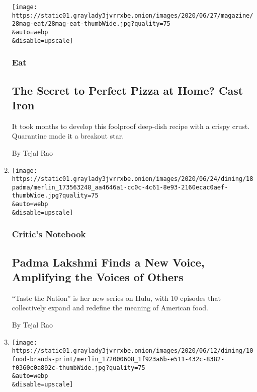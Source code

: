 \begin{enumerate}
  \texttt{[image: https://static01.graylady3jvrrxbe.onion/images/2020/06/27/magazine/28mag-eat/28mag-eat-thumbWide.jpg?quality=75\\\&auto=webp\\\&disable=upscale]}

  \hypertarget{eat-}{%
  \subsubsection{Eat }\label{eat-}}

  \hypertarget{the-secret-to-perfect-pizza-at-home-cast-iron}{%
  \subsection{The Secret to Perfect Pizza at Home? Cast
  Iron}\label{the-secret-to-perfect-pizza-at-home-cast-iron}}

  It took months to develop this foolproof deep-dish recipe with a
  crispy crust. Quarantine made it a breakout star.

  By Tejal Rao
\item
  \href{/2020/06/18/dining/padma-lakshmi-taste-the-nation.html}{}

  \texttt{[image: https://static01.graylady3jvrrxbe.onion/images/2020/06/24/dining/18padma/merlin\_173563248\_aa4646a1-cc0c-4c61-8e93-2160ecac0aef-thumbWide.jpg?quality=75\\\&auto=webp\\\&disable=upscale]}

  \hypertarget{critics-notebook-2}{%
  \subsubsection{Critic's Notebook}\label{critics-notebook-2}}

  \hypertarget{padma-lakshmi-finds-a-new-voice-amplifying-the-voices-of-others}{%
  \subsection{Padma Lakshmi Finds a New Voice, Amplifying the Voices of
  Others}\label{padma-lakshmi-finds-a-new-voice-amplifying-the-voices-of-others}}

  ``Taste the Nation'' is her new series on Hulu, with 10 episodes that
  collectively expand and redefine the meaning of American food.

  By Tejal Rao
\item
  \href{/2020/06/11/dining/food-brands-black-lives-matter-social-media.html}{}

  \texttt{[image: https://static01.graylady3jvrrxbe.onion/images/2020/06/12/dining/10food-brands-print/merlin\_172000608\_1f923a6b-e511-432c-8382-f0360c0a892c-thumbWide.jpg?quality=75\\\&auto=webp\\\&disable=upscale]}


\end{enumerate}
